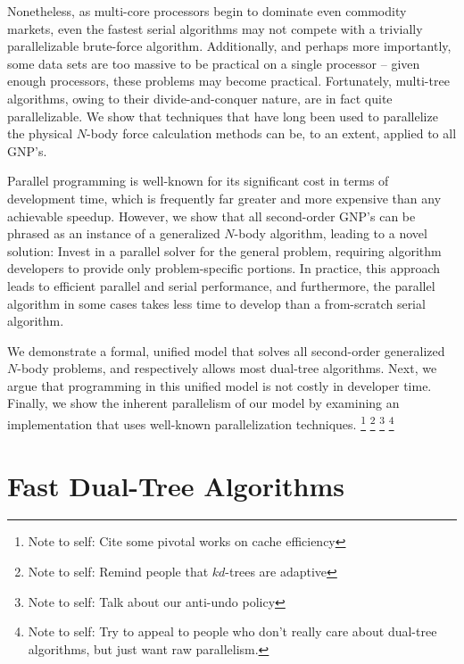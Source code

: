 \documentclass[twoside,leqno,twocolumn]{article}
\newcommand{\authornote}[1]{\footnote{Note to self: #1}}
\newcommand{\authorsnote}[1]{\authornote{#1}}
\begin{document}
Nonetheless, as multi-core processors begin to dominate even commodity markets, even the fastest serial algorithms may not compete with a trivially parallelizable brute-force algorithm.
Additionally, and perhaps more importantly, some data sets are too massive to be practical on a single processor -- given enough processors, these problems may become practical.
Fortunately, multi-tree algorithms, owing to their divide-and-conquer nature, are in fact quite parallelizable.
We show that techniques that have long been used to parallelize the physical $N$-body force calculation methods can be, to an extent, applied to all GNP's.

Parallel programming is well-known for its significant cost in terms of development time, which is frequently far greater and more expensive than any achievable speedup.
However, we show that all second-order GNP's can be phrased as an instance of a generalized $N$-body algorithm, leading to a novel solution: Invest in a parallel solver for the general problem, requiring algorithm developers to provide only problem-specific portions.
In practice, this approach leads to efficient parallel and serial performance, and furthermore, the parallel algorithm in some cases takes less time to develop than a from-scratch serial algorithm.


We demonstrate a formal, unified model that solves all second-order generalized $N$-body problems, and respectively allows most dual-tree algorithms.
Next, we argue that programming in this unified model is not costly in developer time.
Finally, we show the inherent parallelism of our model by examining an implementation that uses well-known parallelization techniques.
\authorsnote{Cite some pivotal works on cache efficiency}
\authorsnote{Remind people that $kd$-trees are adaptive}
\authorsnote{Talk about our anti-undo policy}
\authorsnote{Try to appeal to people who don't really care about dual-tree algorithms, but just want raw parallelism.}

\section{Fast Dual-Tree Algorithms}
\end{document}
